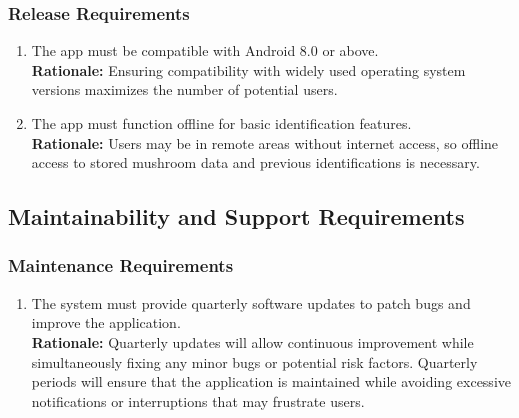 \documentclass[]{article}
\begin{document}
\subsubsection{Release Requirements}
\label{ssub:release_requirements}
\begin{enumerate}[{OE-R}1. ]
	\item The app must be compatible with Android 8.0 or above.\\
	\textbf{Rationale:} Ensuring compatibility with widely used operating system versions maximizes the number of potential users.
	\item The app must function offline for basic identification features.\\
	\textbf{Rationale:} Users may be in remote areas without internet access, so offline access to stored mushroom data and previous identifications is necessary.
\end{enumerate}


\subsection{Maintainability and Support Requirements}
\label{sub:maintainability_and_support_requirements}

\subsubsection{Maintenance Requirements}
\label{ssub:maintenance_requirements}
\begin{enumerate}[{MS-M}1. ]
	\item The system must provide quarterly software updates to patch bugs and improve the application.\\
	\textbf{Rationale:} Quarterly updates will allow continuous improvement while simultaneously fixing any minor bugs or potential risk factors. Quarterly periods will ensure that the application is maintained while avoiding excessive notifications or interruptions that may frustrate users.
\end{enumerate}
\end{document}
